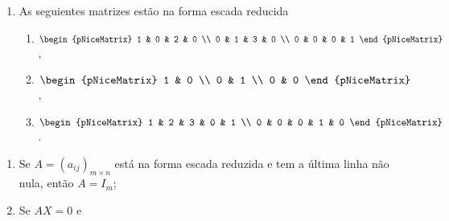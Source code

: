 \begin{example}
\begin{enumerate}
    \item

          As seguientes matrizes estão na forma escada reducida
          \begin{multicols}{2}

            \begin{enumerate}
              \item

                    \begin{math}
                      \begin{pNiceMatrix}
                        1 & 0 & 2 & 0 \\
                        0 & 1 & 3 & 0 \\
                        0 & 0 & 0 & 1
                      \end{pNiceMatrix}
                    \end{math},

              \item

                    \begin{math}
                      \begin{pNiceMatrix}
                        1 & 0 \\
                        0 & 1 \\
                        0 & 0
                      \end{pNiceMatrix}
                    \end{math},


              \item

                    \begin{math}
                      \begin{pNiceMatrix}
                        1 & 2 & 3 & 0 & 1 \\
                        0 & 0 & 0 & 1 & 0
                      \end{pNiceMatrix}
                    \end{math}.
            \end{enumerate}
          \end{multicols}

  \end{enumerate}
\end{example}

\begin{remark}
  \begin{enumerate}
    \item

          Se $A={\left(a_{ij}\right)}_{m\times n}$ está na forma escada reduzida e tem a última linha não nula, então $A=I_{m}$;

    \item Se $AX=0$ e

  \end{enumerate}
\end{remark}

